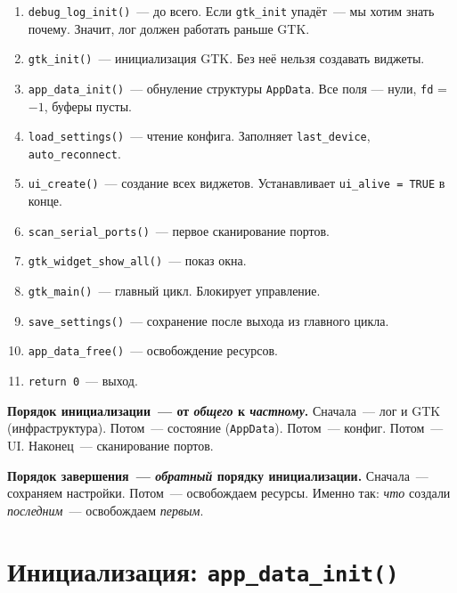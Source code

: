 \begin{enumerate}
    \item \texttt{debug\_log\_init()}~--- до всего.
          Если \texttt{gtk\_init} упадёт~--- мы хотим
          знать почему. Значит, лог должен работать
          раньше GTK.
    \item \texttt{gtk\_init()}~--- инициализация GTK.
          Без неё нельзя создавать виджеты.
    \item \texttt{app\_data\_init()}~--- обнуление
          структуры \texttt{AppData}. Все поля — нули,
          \texttt{fd} = $-1$, буферы пусты.
    \item \texttt{load\_settings()}~--- чтение конфига.
          Заполняет \texttt{last\_device}, \texttt{auto\_reconnect}.
    \item \texttt{ui\_create()}~--- создание всех
          виджетов. Устанавливает \texttt{ui\_alive = TRUE}
          в конце.
    \item \texttt{scan\_serial\_ports()}~--- первое
          сканирование портов.
    \item \texttt{gtk\_widget\_show\_all()}~--- показ
          окна.
    \item \texttt{gtk\_main()}~--- главный цикл.
          Блокирует управление.
    \item \texttt{save\_settings()}~--- сохранение
          после выхода из главного цикла.
    \item \texttt{app\_data\_free()}~--- освобождение
          ресурсов.
    \item \texttt{return 0}~--- выход.
\end{enumerate}

\begin{keybox}
\textbf{Порядок инициализации~--- от \emph{общего} к \emph{частному}.}
Сначала~--- лог и GTK (инфраструктура). Потом~--- состояние
(\texttt{AppData}). Потом~--- конфиг. Потом~--- UI. Наконец~---
сканирование портов.
\end{keybox}

\begin{notebox}
\textbf{Порядок завершения~--- \emph{обратный} порядку
инициализации.} Сначала~--- сохраняем настройки. Потом~---
освобождаем ресурсы. Именно так: \emph{что} создали
\emph{последним}~--- освобождаем \emph{первым}.
\end{notebox}

\section{Инициализация: \texttt{app\_data\_init()}}
\label{sec:lifecycle-init}


